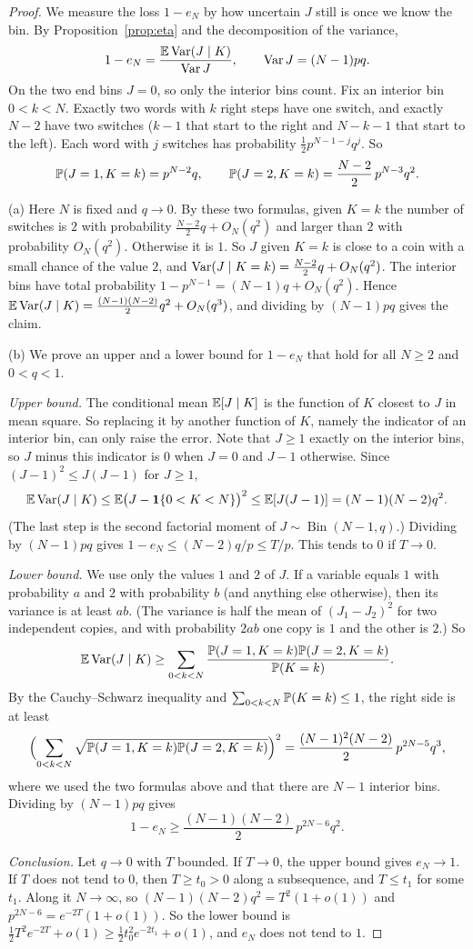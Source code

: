 \begin{proof}
We measure the loss $1-e_N$ by how uncertain $J$ still is once we know the
bin. By Proposition~\ref{prop:eta} and the decomposition of the variance,
\[
 1-e_N=\frac{\mathbb E\operatorname{Var}(J\mid K)}{\operatorname{Var} J},\qquad\operatorname{Var} J=(N-1)pq .
\]
On the two end bins $J=0$, so only the interior bins count. Fix an interior
bin $0<k<N$. Exactly two words with $k$ right steps have one switch, and
exactly $N-2$ have two switches ($k-1$ that start to the right and $N-k-1$
that start to the left). Each word with $j$ switches has probability
$\frac12p^{N-1-j}q^j$. So
\[
 \mathbb P(J=1,K=k)=p^{N-2}q,\qquad\mathbb P(J=2,K=k)=\frac{N-2}2\,p^{N-3}q^2 .
\]

(a) Here $N$ is fixed and $q\to0$. By these two formulas, given $K=k$
the number of switches is $2$ with probability $\frac{N-2}2q+O_N(q^2)$ and
larger than $2$ with probability $O_N(q^2)$. Otherwise it is $1$. So $J$ given
$K=k$ is close to a coin with a small chance of the value $2$, and
$\operatorname{Var}(J\mid K=k)=\frac{N-2}2q+O_N(q^2)$. The interior bins have total
probability $1-p^{N-1}=(N-1)q+O_N(q^2)$. Hence
$\mathbb E\operatorname{Var}(J\mid K)=\frac{(N-1)(N-2)}2q^2+O_N(q^3)$, and dividing by $(N-1)pq$
gives the claim.

(b) We prove an upper and a lower bound for $1-e_N$ that hold for all
$N\ge2$ and $0<q<1$.

\emph{Upper bound.} The conditional mean $\mathbb E[J\mid K]$ is the function of $K$
closest to $J$ in mean square. So replacing it by another function of $K$,
namely the indicator of an interior bin, can only raise the error. Note that
$J\ge1$ exactly on the interior bins, so $J$ minus this indicator is $0$ when
$J=0$ and $J-1$ otherwise. Since $(J-1)^2\le J(J-1)$ for $J\ge1$,
\[
 \mathbb E\operatorname{Var}(J\mid K)\le\mathbb E\bigl(J-\mathbf 1\{0<K<N\}\bigr)^2
 \le\mathbb E[J(J-1)]=(N-1)(N-2)q^2 .
\]
(The last step is the second factorial moment of
$J\sim\operatorname{Bin}(N-1,q)$.) Dividing by $(N-1)pq$ gives
$1-e_N\le(N-2)q/p\le T/p$. This tends to $0$ if $T\to0$.

\emph{Lower bound.} We use only the values $1$ and $2$ of $J$. If a variable
equals $1$ with probability $a$ and $2$ with probability $b$ (and anything
else otherwise), then its variance is at least $ab$. (The variance is half the
mean of $(J_1-J_2)^2$ for two independent copies, and with probability $2ab$
one copy is $1$ and the other is $2$.) So
\[
 \mathbb E\operatorname{Var}(J\mid K)\ge\sum_{0<k<N}\frac{\mathbb P(J=1,K=k)\mathbb P(J=2,K=k)}{\mathbb P(K=k)} .
\]
By the Cauchy--Schwarz inequality and $\sum_{0<k<N}\mathbb P(K=k)\le1$, the right
side is at least
\[
 \Bigl(\sum_{0<k<N}\sqrt{\mathbb P(J=1,K=k)\mathbb P(J=2,K=k)}\Bigr)^2
 =\frac{(N-1)^2(N-2)}2\,p^{2N-5}q^3 ,
\]
where we used the two formulas above and that there are $N-1$ interior bins.
Dividing by $(N-1)pq$ gives
\[
 1-e_N\ge\frac{(N-1)(N-2)}2\,p^{2N-6}q^2 .
\]

\emph{Conclusion.} Let $q\to0$ with $T$ bounded. If $T\to0$, the upper bound
gives $e_N\to1$. If $T$ does not tend to $0$, then $T\ge t_0>0$ along a
subsequence, and $T\le t_1$ for some $t_1$. Along it $N\to\infty$, so
$(N-1)(N-2)q^2=T^2(1+o(1))$ and $p^{2N-6}=e^{-2T}(1+o(1))$. So the lower bound
is $\frac12T^2e^{-2T}+o(1)\ge\frac12t_0^2e^{-2t_1}+o(1)$, and $e_N$ does not
tend to $1$.
\end{proof}

